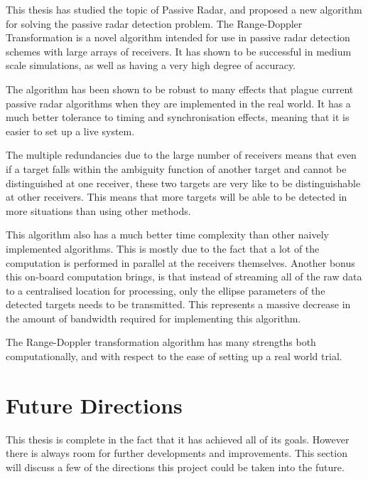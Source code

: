 \documentclass[12pt,openany,a4paper]{book}
\begin{document}
This thesis has studied the topic of Passive Radar, and proposed a new algorithm for solving the passive radar detection problem. The Range-Doppler Transformation is a novel algorithm intended for use in passive radar detection schemes with large arrays of receivers. It has shown to be successful in medium scale simulations, as well as having a very high degree of accuracy.

\bigskip

The algorithm has been shown to be robust to many effects that plague current passive radar algorithms when they are implemented in the real world. It has a much better tolerance to timing and synchronisation effects, meaning that it is easier to set up a live system.

\bigskip

The multiple redundancies due to the large number of receivers means that even if a target falls within the ambiguity function of another target and cannot be distinguished at one receiver, these two targets are very like to be distinguishable at other receivers. This means that more targets will be able to be detected in more situations than using other methods.

\bigskip

This algorithm also has a much better time complexity than other naively implemented algorithms. This is mostly due to the fact that a lot of the computation is performed in parallel at the receivers themselves. Another bonus this on-board computation brings, is that instead of streaming all of the raw data to a centralised location for processing, only the ellipse parameters of the detected targets needs to be transmitted. This represents a massive decrease in the amount of bandwidth required for implementing this algorithm.

\bigskip

The Range-Doppler transformation algorithm has many strengths both computationally, and with respect to the ease of setting up a real world trial. 

\cleardoublepage

\chapter{Future Directions}

This thesis is complete in the fact that it has achieved all of its goals. However there is always room for further developments and improvements. This section will discuss a few of the directions this project could be taken into the future.
\end{document}
